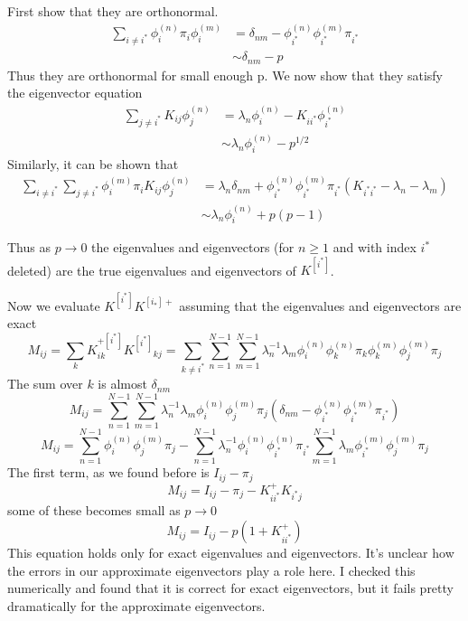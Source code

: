 \documentclass[a4paper]{article}
\newcommand{\evec}[2]{\phi^{(#2)}_{#1}}
\newcommand{\subK}{K^{[i^{*}]}}
\begin{document}
First show that they are orthonormal.
\begin{align}
\sum_{i\ne i^{*}} \evec{i}{n} \pi_i \evec{i}{m} &= \delta_{nm} - \evec{i^{*}}{n} \evec{i^{*}}{m} \pi_{i^{*}} \\
& \sim \delta_{nm} - p
\end{align}
Thus they are orthonormal for small enough p.  We now show that they satisfy the eigenvector equation
\begin{align}
\sum_{j\ne i^{*}} K_{ij} \evec{j}{n}  &=
\lambda_n \evec{i}{n} - K_{i i^{*}} \evec{i^{*}}{n} \\
& \sim \lambda_n \evec{i}{n} - p^{1/2}
\end{align}
Similarly, it can be shown that
\begin{align}
\sum_{i\ne i^{*}} 
\sum_{j\ne i^{*}} 
\evec{i}{m} \pi_{i}
K_{ij} \evec{j}{n} 
&= \lambda_n \delta_{nm} + \evec{i^{*}}{n} \evec{i^{*}}{m} \pi_{i^{*}} (K_{i^{*} i^{*}} - \lambda_n - \lambda_m)
\\
& \sim \lambda_n \evec{i}{n} + p (p - 1)
\end{align}

Thus as $p \to 0$ the eigenvalues and eigenvectors (for $n \ge 1$ and with index $i^{*}$ deleted) are the true
eigenvalues and eigenvectors of $\subK{}$.

Now we evaluate $\subK{} K^{[i_{*}]+}$ assuming that the eigenvalues and eigenvectors are exact
\begin{equation}
M_{ij} = \sum_{k} K^{+[i^{*}]}_{ik} \subK{}_{kj}  = 
\sum_{k \ne i^{*}} \sum_{n=1}^{N-1} \sum_{m=1}^{N-1} \lambda_n^{-1} \lambda_m \evec{i}{n} \evec{k}{n} \pi_k \evec{k}{m} \evec{j}{m} \pi_j
\end{equation}
The sum over $k$ is almost $\delta_{nm}$
\begin{equation}
M_{ij} = 
\sum_{n=1}^{N-1} \sum_{m=1}^{N-1} \lambda_n^{-1} \lambda_m \evec{i}{n} \evec{j}{m} \pi_j 
\left( \delta_{nm} - \evec{i^{*}}{n} \evec{i^{*}}{m} \pi_{i^{*}} \right)
\end{equation}
\begin{equation}
M_{ij} = 
\sum_{n=1}^{N-1} \evec{i}{n} \evec{j}{m} \pi_j 
-
\sum_{n=1}^{N-1} \lambda_n^{-1} \evec{i}{n} \evec{i^{*}}{n}  \pi_{i^{*}}
\sum_{m=1}^{N-1} \lambda_m 
\evec{i^{*}}{m} \evec{j}{m} \pi_j  
\end{equation}
The first term, as we found before is $I_{ij} - \pi_j$
\begin{equation}
M_{ij} = 
I_{ij} - \pi_j 
-
K^+_{ii^{*}} K_{i^{*}j}
\end{equation}
some of these becomes small as $p \to 0$
\begin{equation}
M_{ij} = 
I_{ij} - p (1 + K^+_{ii^{*}} )
\end{equation}
This equation holds only for exact eigenvalues and eigenvectors.  It's unclear how the
errors in our approximate eigenvectors play a role here.
I checked this numerically and found that it is correct for exact eigenvectors, but it fails pretty dramatically
for the approximate eigenvectors.
\end{document}
